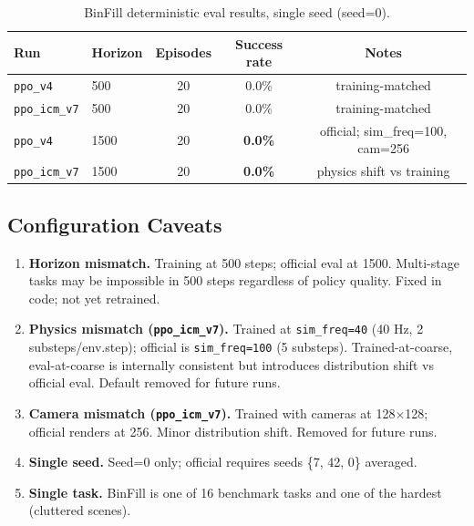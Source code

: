 \documentclass[11pt,letterpaper]{article}
\begin{document}
\begin{table}[H]
\centering
\begin{tabular}{llccc}
\toprule
\textbf{Run} & \textbf{Horizon} & \textbf{Episodes} & \textbf{Success rate} &
\textbf{Notes} \\
\midrule
\texttt{ppo\_v4}     & 500  & 20 & 0.0\% & training-matched \\
\texttt{ppo\_icm\_v7} & 500 & 20 & 0.0\% & training-matched \\
\texttt{ppo\_v4}     & 1500 & 20 & \textbf{0.0\%} & official; sim\_freq=100, cam=256 \\
\texttt{ppo\_icm\_v7} & 1500 & 20 & \textbf{0.0\%} & physics shift vs training \\
\bottomrule
\end{tabular}
\caption{BinFill deterministic eval results, single seed (seed=0).}
\end{table}

\subsection{Configuration Caveats}
\label{sec:binfill-caveats}

\begin{enumerate}
  \item \textbf{Horizon mismatch.} Training at 500 steps; official eval at 1500.
        Multi-stage tasks may be impossible in 500 steps regardless of policy quality.
        Fixed in code; not yet retrained.
  \item \textbf{Physics mismatch (\texttt{ppo\_icm\_v7}).} Trained at
        \texttt{sim\_freq=40} (40 Hz, 2 substeps/env.step); official is
        \texttt{sim\_freq=100} (5 substeps). Trained-at-coarse, eval-at-coarse is
        internally consistent but introduces distribution shift vs official eval.
        Default removed for future runs.
  \item \textbf{Camera mismatch (\texttt{ppo\_icm\_v7}).} Trained with cameras at
        128$\times$128; official renders at 256. Minor distribution shift. Removed
        for future runs.
  \item \textbf{Single seed.} Seed=0 only; official requires seeds \{7, 42, 0\} averaged.
  \item \textbf{Single task.} BinFill is one of 16 benchmark tasks and one of the
        hardest (cluttered scenes).
\end{enumerate}

\end{document}
